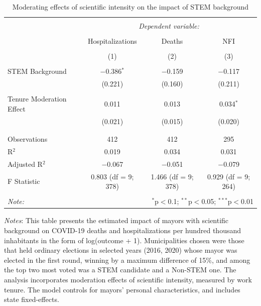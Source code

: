 \documentclass[
  letterpaper,
  DIV=11,
  numbers=noendperiod]{scrartcl}
\begin{document}
\begin{table}[!htbp] \centering 
  \caption{Moderating effects of scientific intensity on the impact of STEM background} 
  \label{} 
\begin{tabular}{@{\extracolsep{5pt}}lccc} 
\\[-1.8ex]\hline 
\hline \\[-1.8ex] 
 & \multicolumn{3}{c}{\textit{Dependent variable:}} \\ 
\cline{2-4} 
\\[-1.8ex] & Hospitalizations & Deaths & NFI \\ 
\\[-1.8ex] & (1) & (2) & (3)\\ 
\hline \\[-1.8ex] 
 STEM Background & $-$0.386$^{*}$ & $-$0.159 & $-$0.117 \\ 
  & (0.221) & (0.160) & (0.211) \\ 
  & & & \\ 
 Tenure Moderation Effect & 0.011 & 0.013 & 0.034$^{*}$ \\ 
  & (0.021) & (0.015) & (0.020) \\ 
  & & & \\ 
\hline \\[-1.8ex] 
Observations & 412 & 412 & 295 \\ 
R$^{2}$ & 0.019 & 0.034 & 0.031 \\ 
Adjusted R$^{2}$ & $-$0.067 & $-$0.051 & $-$0.079 \\ 
F Statistic & 0.803 (df = 9; 378) & 1.466 (df = 9; 378) & 0.929 (df = 9; 264) \\ 
\hline 
\hline \\[-1.8ex] 
\textit{Note:}  & \multicolumn{3}{r}{$^{*}$p$<$0.1; $^{**}$p$<$0.05; $^{***}$p$<$0.01} \\ 
\end{tabular} 
\end{table}

\emph{Notes}: This table presents the estimated impact of mayors with
scientific background on COVID-19 deaths and hospitalizations per
hundred thousand inhabitants in the form of log(outcome + 1).
Municipalities chosen were those that held ordinary elections in
selected years (2016, 2020) whose mayor was elected in the first round,
winning by a maximum difference of 15\%, and among the top two most
voted was a STEM candidate and a Non-STEM one. The analysis incorporates
moderation effects of scientific intensity, measured by work tenure. The
model controls for mayors' personal characteristics, and includes state
fixed-effects.
\end{document}

